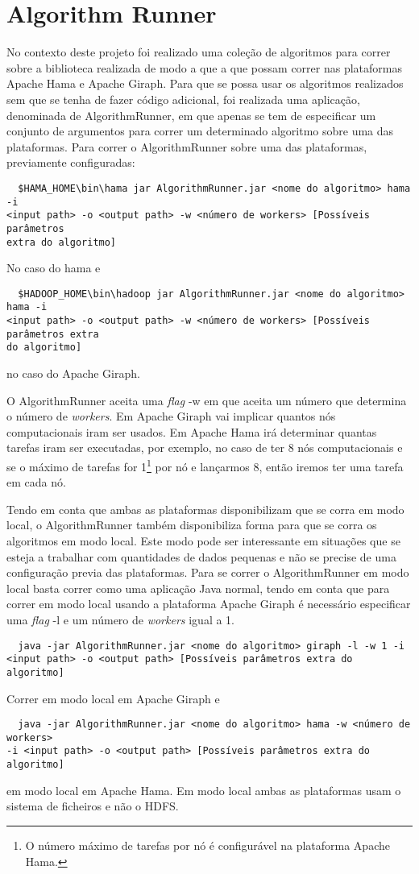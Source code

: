 	\chapter{Algorithm Runner}
  No contexto deste projeto foi realizado uma coleção de algoritmos para 
correr sobre a biblioteca realizada de modo a que a que possam correr nas 
plataformas Apache Hama e Apache Giraph. Para que se possa usar os algoritmos 
realizados sem que se tenha de fazer código adicional, foi realizada uma 
aplicação, denominada de AlgorithmRunner, em que apenas se tem de especificar um 
conjunto de argumentos para correr um determinado algoritmo sobre uma das 
plataformas.
  Para correr o AlgorithmRunner sobre uma das plataformas, previamente 
configuradas:
  \begin{verbatim}
  $HAMA_HOME\bin\hama jar AlgorithmRunner.jar <nome do algoritmo> hama -i 
<input path> -o <output path> -w <número de workers> [Possíveis parâmetros 
extra do algoritmo]
  \end{verbatim}
  No caso do hama e
  \begin{verbatim}
  $HADOOP_HOME\bin\hadoop jar AlgorithmRunner.jar <nome do algoritmo> hama -i 
<input path> -o <output path> -w <número de workers> [Possíveis parâmetros extra 
do algoritmo]
  \end{verbatim}
  no caso do Apache Giraph.
  
  O AlgorithmRunner aceita uma \textit{flag} -w em que aceita um número que 
determina o número de \textit{workers}. Em Apache Giraph vai implicar quantos 
nós computacionais iram ser usados. Em Apache Hama irá determinar quantas 
tarefas iram ser executadas, por exemplo, no caso de ter 8 nós computacionais 
e se o máximo de tarefas for 1\footnote{O número máximo de tarefas por nó é 
configurável na plataforma Apache Hama.} por nó e lançarmos 8, então iremos ter 
uma tarefa em cada nó.
  
  Tendo em conta que ambas as plataformas disponibilizam que se corra em modo 
local, o AlgorithmRunner também disponibiliza forma para que se corra os 
algoritmos em modo local. Este modo pode ser interessante em situações que se 
esteja a trabalhar com quantidades de dados pequenas e não se precise de uma 
configuração previa das plataformas. Para se correr o AlgorithmRunner em modo 
local basta correr como uma aplicação Java normal, tendo em conta que para 
correr em modo local usando a plataforma Apache Giraph é necessário especificar 
uma \textit{flag} -l e um número de \textit{workers} igual a 1.
\begin{verbatim}
  java -jar AlgorithmRunner.jar <nome do algoritmo> giraph -l -w 1 -i 
<input path> -o <output path> [Possíveis parâmetros extra do algoritmo]
  \end{verbatim}
Correr em modo local em Apache Giraph e
\begin{verbatim}
  java -jar AlgorithmRunner.jar <nome do algoritmo> hama -w <número de workers> 
-i <input path> -o <output path> [Possíveis parâmetros extra do algoritmo]
  \end{verbatim}
em modo local em Apache Hama. Em modo local ambas as plataformas usam o sistema 
de ficheiros e não o HDFS.